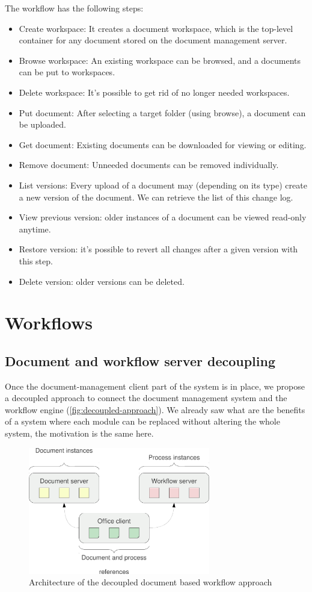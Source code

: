 The workflow has the following steps:

\begin{itemize}
\item Create workspace: It creates a document workspace, which is the top-level
container for any document stored on the document management server.
\item Browse workspace: An existing workspace can be browsed, and a documents
can be put to workspaces.
\item Delete workspace: It's possible to get rid of no longer needed workspaces.
\item Put document: After selecting a target folder (using browse), a document
can be uploaded.
\item Get document: Existing documents can be downloaded for viewing or editing.
\item Remove document: Unneeded documents can be removed individually.
\item List versions: Every upload of a document may (depending on its type)
create a new version of the document. We can retrieve the list of this change log.
\item View previous version: older instances of a document can be viewed
read-only anytime.
\item Restore version: it's possible to revert all changes after a given
version with this step.
\item Delete version: older versions can be deleted.
\end{itemize}

\section{Workflows}

\subsection*{Document and workflow server decoupling}

Once the document-management client part of the system is in place, we propose
a decoupled approach to connect the document management system and the workflow
engine (\autoref{fig:decoupled-approach}). We already saw what are the
benefits of a system where each module can be replaced without altering the
whole system, the motivation is the same here.

\begin{figure}[H]
\centering
\includegraphics[width=300px,keepaspectratio]{decoupled-approach.pdf}
\caption{Architecture of the decoupled document based workflow approach}
\label{fig:decoupled-approach}
\end{figure}

